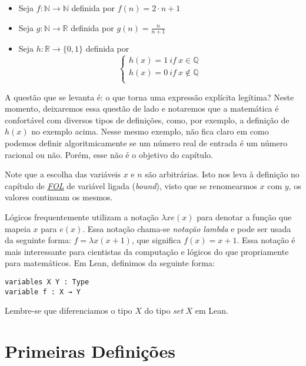 \begin{itemize}
    \item Seja $f: \mathbb{N} \to \mathbb{N}$ definida por 
    $f(n) = 2\cdot n + 1$
    \item Seja $g : \mathbb{N} \to \mathbb{R}$ definida por 
    $g(n) = \frac{n}{n+1}$
    \item Seja $h : \mathbb{R} \to \{0,1\}$ definida por 
    $$\left \{ \begin{array}{c}
    h(x) = 1 ~if~x \in \mathbb{Q} \\
    h(x) = 0 ~ if ~ x \not \in \mathbb{Q} \\
    \end{array}
    \right. $$
 \end{itemize}

A questão que se levanta é: o que torna uma expressão explícita legítima? 
Neste momento, deixaremos essa questão de lado e notaremos que a matemática 
é confortável com diversos tipos de definições, como, por exemplo, a definição 
de $h(x)$ no exemplo acima. Nesse mesmo exemplo, não fica claro em como podemos 
definir algoritmicamente se um número real de entrada é um número racional ou não.
Porém, esse não é o objetivo do capítulo.

Note que a escolha das variáveis $x$ e $n$ são arbitrárias. 
Isto nos leva à definição no capítulo de \textit{\hyperlink{chapter.4}{FOL}} de 
variável ligada (\textit{bound}), visto que se renomearmos $x$ com $y$, os valores
continuam os mesmos. 

Lógicos frequentemente utilizam a notação $\lambda x e(x)$ para denotar a função
que mapeia $x$ para $e(x)$. Essa notação chama-se \textit{notação lambda} e pode 
ser usada da seguinte forma: $f = \lambda x(x + 1)$, que significa $f(x) = x + 1$. 
Essa notação é mais interessante para cientistas da computação e lógicos do que 
propriamente para matemáticos. Em Lean, definimos da seguinte forma: 

\begin{lstlisting}
variables X Y : Type
variable f : X → Y    
\end{lstlisting}

Lembre-se que diferenciamos o tipo $X$ do tipo $set~X$ em Lean.

\section{Primeiras Definições}

\theoremstyle{definition}
\newtheorem{definition}{Definição}[section]

